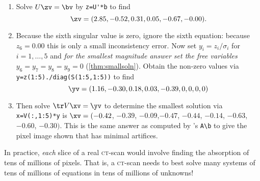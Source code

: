 \begin{example}
\begin{enumerate}
\item Solve \(U\zv=\bv\) by \verb|z=U'*b| to find
\begin{equation*}
\zv=(2.85,-0.52, 0.31, 0.05,-0.67,-0.00).
\end{equation*}

\item Because the sixth singular value is zero, ignore the sixth equation: because \(z_6=0.00\) this is only a small inconsistency error.
Now set $y_i=z_i/\sigma_i$ for \(i=1,\ldots,5\) and \emph{for the smallest magnitude answer set the free variables} \(y_6=y_7=y_8=y_9=0\) (\autoref{thm:smallsoln}).
Obtain the non-zero values via \verb|y=z(1:5)./diag(S(1:5,1:5))| to find
\begin{equation*}
\yv=(1.16,-0.30, 0.18, 0.03,-0.39,0,0,0,0)
\end{equation*}

\item Then solve \(\tr V\xv=\yv\) to determine the smallest solution via \verb|x=V(:,1:5)*y| is
\(\xv= (-0.42\), \(-0.39\), \(-0.09\),\( -0.47\), \(-0.44\), \(-0.14\), \(-0.63\), \(-0.60\), \(-0.30)\).
%
This is the same answer as computed by \script[2]'s \verb|A\b| to give the pixel image shown that has minimal artifices.
\end{enumerate}
In practice, \emph{each} slice of a real \textsc{ct}-scan would involve finding the absorption of tens of millions of pixels.
That is, a \textsc{ct}-scan needs to best solve many systems of tens of millions of equations in tens of millions of unknowns!
\end{example}



%





